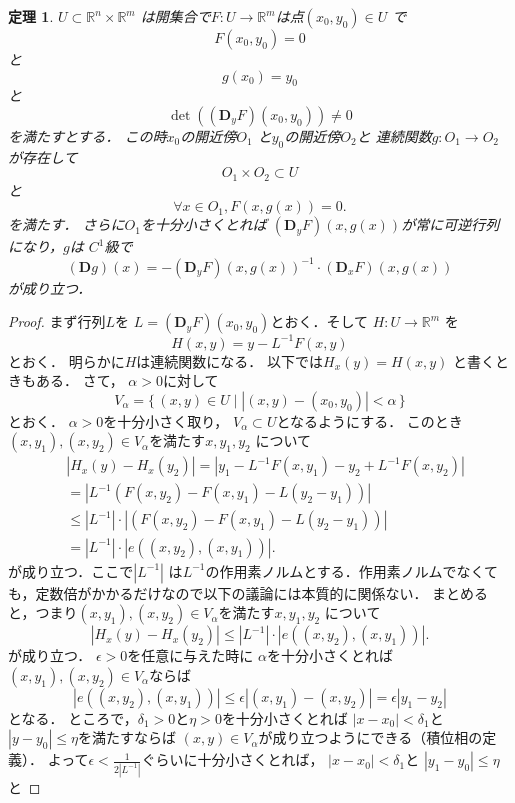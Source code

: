 \documentclass[leqno, a4paper, 12pt]{jsarticle}
\newtheorem{thm}{定理}
\newcommand{\rr}{\mathbb{R}}
\newcommand{\ddd}{\mathbf{D}}
\begin{document}
\begin{thm}\label{thm:implicit}
$U\subset \rr^{n}\times \rr^{m}$
は開集合で$F:U\to \rr^{m}$は点$(x_{0}, y_{0})\in U$
で
\[
F(x_{0}, y_{0})=0
\]
と
\[
g(x_{0})=y_{0}
\]
と
\[
\det((\ddd_{y} F)(x_{0}, y_{0}))\neq 0
\]
を満たすとする．
この時$x_{0}$の開近傍$O_{1}$
と$y_{0}$の開近傍$O_{2}$と
連続関数$g: O_{1}\to O_{2}$が存在して
\[
O_{1}\times O_{2}\subset U
\]
と
\[
\forall x\in O_{1}, F(x, g(x))=0. 
\]
を満たす．
さらに$O_{1}$を十分小さくとれば
$(\ddd_{y}F)(x, g(x))$が常に可逆行列になり，$g$は
$C^{1}$級で
\[
(\ddd g)(x)=-(\ddd_{y} F)(x, g(x))^{-1}\cdot (\ddd_{x}F)(x, g(x))
\]
が成り立つ．
\end{thm}
\begin{proof}
まず行列$L$を
$L=(\ddd_{y} F)(x_{0}, y_{0})$とおく．そして
$H: U\to \rr^{m}$
を
\[
H(x, y)=y-L^{-1}F(x, y)
\]
とおく．
明らかに$H$は連続関数になる．
以下では$H_{x}(y)=H(x, y)$
と書くときもある．
さて，
$\alpha>0$に対して
\[
V_{\alpha}=\{\, 
(x, y)\in U\mid |(x, y)-(x_{0}, y_{0})|<\alpha
\, \}
\]
とおく．
$\alpha>0$を十分小さく取り，
$V_{\alpha}\subset U$となるようにする．
このとき$(x, y_{1}), (x, y_{2})\in V_{\alpha}$を満たす$x, y_{1}, y_{2}$
について
\begin{align*}
&|H_{x}(y)-H_{x}(y_{2})|=
|y_{1}-L^{-1}F(x, y_{1})-y_{2}+L^{-1}F(x, y_{2})|\\
&=
|L^{-1}(F(x, y_{2})-F(x, y_{1})-L(y_{2}-y_{1}))|\\
&\le 
|L^{-1}|\cdot|(F(x, y_{2})-F(x, y_{1})-L(y_{2}-y_{1}))|\\
&=
|L^{-1}|\cdot |e((x, y_{2}), (x, y_{1}))|. 
\end{align*}
が成り立つ．ここで$|L^{-1}|$
は$L^{-1}$の作用素ノルムとする．作用素ノルムでなくても，定数倍がかかるだけなので以下の議論には本質的に関係ない．
まとめると，つまり$(x, y_{1}), (x, y_{2})\in V_{\alpha}$を満たす$x, y_{1}, y_{2}$
について
\begin{equation}\label{eq:hyouka}
|H_{x}(y)-H_{x}(y_{2})|
\le 
|L^{-1}|\cdot |e((x, y_{2}), (x, y_{1}))|. 
\end{equation}
が成り立つ．
$\epsilon>0$を任意に与えた時に
$\alpha$を十分小さくとれば
$(x, y_{1}), (x, y_{2})\in V_{\alpha}$ならば
\[
|e((x, y_{2}), (x, y_{1}))|
\le \epsilon|(x, y_{1})-(x, y_{2})|=\epsilon|y_{1}-y_{2}|
\]
となる．
ところで，$\delta_{1}>0$と$\eta>0$を十分小さくとれば
$|x-x_{0}|<\delta_{1}$と
$|y-y_{0}|\le \eta$を満たすならば
$(x, y)\in V_{\alpha}$が成り立つようにできる（積位相の定義）．
よって$\epsilon<\frac{1}{2|L^{-1}|}$ぐらいに十分小さくとれば，
$|x-x_{0}|<\delta_{1}$と
$|y_{1}-y_{0}|\le \eta$と

\end{proof}
\end{document}
